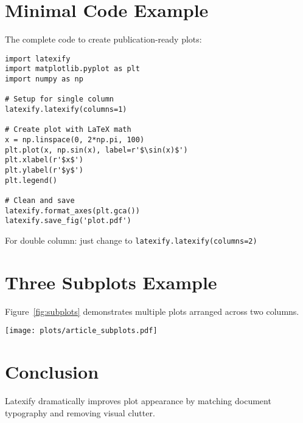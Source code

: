 \documentclass[twocolumn]{article}
\begin{document}
\section{Minimal Code Example}

The complete code to create publication-ready plots:

\begin{verbatim}
import latexify
import matplotlib.pyplot as plt
import numpy as np

# Setup for single column
latexify.latexify(columns=1)

# Create plot with LaTeX math
x = np.linspace(0, 2*np.pi, 100)
plt.plot(x, np.sin(x), label=r'$\sin(x)$')
plt.xlabel(r'$x$')
plt.ylabel(r'$y$')
plt.legend()

# Clean and save
latexify.format_axes(plt.gca())
latexify.save_fig('plot.pdf')
\end{verbatim}

For double column: just change to \texttt{latexify.latexify(columns=2)}

\section{Three Subplots Example}

Figure~\ref{fig:subplots} demonstrates multiple plots arranged across two columns.

\begin{figure*}[htbp]
    \centering
    \texttt{[image: plots/article\_subplots.pdf]}
    \caption{Three subplot example optimized for double-column layout showing (a) sine wave, (b) cosine wave, and (c) damped sine wave.}
    \label{fig:subplots}
\end{figure*}

\section{Conclusion}

Latexify dramatically improves plot appearance by matching document typography and removing visual clutter.
\end{document}
